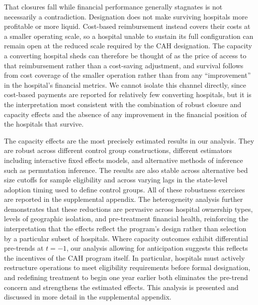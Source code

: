 \documentclass[a4paper, 12pt, twoside]{article}
\begin{document}
That closures fall while financial performance generally stagnates is not necessarily a contradiction. Designation does not make surviving hospitals more profitable or more liquid. Cost-based reimbursement instead covers their costs at a smaller operating scale, so a hospital unable to sustain its full configuration can remain open at the reduced scale required by the CAH designation. The capacity a converting hospital sheds can therefore be thought of as the price of access to that reimbursement rather than a cost-saving adjustment, and survival follows from cost coverage of the smaller operation rather than from any ``improvement'' in the hospital's financial metrics. We cannot isolate this channel directly, since cost-based payments are reported for relatively few converting hospitals, but it is the interpretation most consistent with the combination of robust closure and capacity effects and the absence of any improvement in the financial position of the hospitals that survive.

The capacity effects are the most precisely estimated results in our analysis. They are robust across different control group constructions, different estimators including interactive fixed effects models, and alternative methods of inference such as permutation inference. The results are also stable across alternative bed size cutoffs for sample eligibility and across varying lags in the state-level adoption timing used to define control groups. All of these robustness exercises are reported in the supplemental appendix. The heterogeneity analysis further demonstrates that these reductions are pervasive across hospital ownership types, levels of geographic isolation, and pre-treatment financial health, reinforcing the interpretation that the effects reflect the program's design rather than selection by a particular subset of hospitals. Where capacity outcomes exhibit differential pre-trends at $t = -1$, our analysis allowing for anticipation suggests this reflects the incentives of the CAH program itself. In particular, hospitals must actively restructure operations to meet eligibility requirements before formal designation, and redefining treatment to begin one year earlier both eliminates the pre-trend concern and strengthens the estimated effects. This analysis is presented and discussed in more detail in the supplemental appendix.
\end{document}

